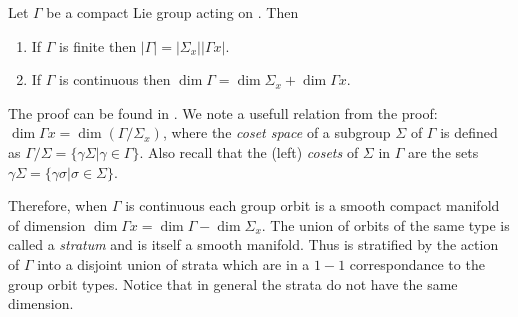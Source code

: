 \begin{proposition}
 Let $\Gamma$ be a compact Lie group acting on . Then
 \begin{enumerate}
  \item If $\Gamma$ is finite then $|\Gamma|=|\Sigma_x||\Gamma x|$.
  \item If $\Gamma$ is continuous then $\dim \Gamma = \dim \Sigma_x+\dim \Gamma x$.
 \end{enumerate}
\end{proposition}
The proof can be found in . We note a usefull relation from the proof: $\dim\Gamma x =\dim(\Gamma/\Sigma_x)$, where the \emph{coset space} of a subgroup $\Sigma$  of $\Gamma$ is defined as $\Gamma/\Sigma=\{\gamma\Sigma|\gamma\in\Gamma\}$. Also recall that the (left) \emph{cosets} of $\Sigma$ in $\Gamma$ are the sets $\gamma\Sigma=\{\gamma\sigma|\sigma\in\Sigma\}$.

Therefore, when $\Gamma$ is continuous each group orbit is a smooth compact manifold of dimension
$\dim \Gamma x=\dim \Gamma-\dim \Sigma_x$. The union of orbits of the same type is called a \emph{stratum}
and is itself a smooth manifold. Thus  is stratified by the action of $\Gamma$ into
a disjoint union of strata which are in a $1-1$ correspondance to the group orbit types. Notice that in general
the strata do not have the same dimension.



